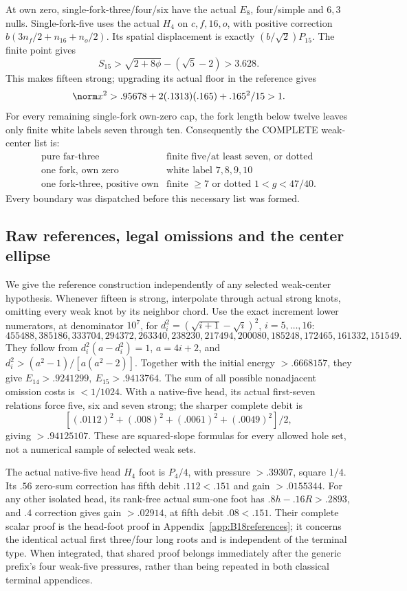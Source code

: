 At own zero, single-fork-three/four/six have the actual \(E_8\),
four/simple and \(6,3\) nulls. Single-fork-five uses the actual
\(H_4\) on \(c,f,16,o\), with positive correction
\(b(3n_f/2+n_{16}+n_o/2)\).
Its spatial displacement is exactly \((b/\sqrt2)P_{15}\).
The finite point gives
\[
 S_{15}>\sqrt{2+8\phi}-(\sqrt5-2)>3.628 .
\]
This makes fifteen strong; upgrading its actual floor in the reference
gives
\[
 \norm x^2>.95678+2(.1313)(.165)+.165^2/15>1 .
\]
For every remaining single-fork own-zero cap, the fork length below
twelve leaves only finite white labels seven through ten.
Consequently the COMPLETE weak-center list is:
\[
 \begin{array}{c|c}
 \text{pure far-three}&\text{finite five/at least seven, or dotted}\\
 \text{one fork, own zero}&\text{white label }7,8,9,10\\
 \text{one fork-three, positive own}&\text{finite }\geq7
                         \text{ or dotted }1<g<47/40 .
 \end{array}
\]
Every boundary was dispatched before this necessary list was formed.

\subsection{Raw references, legal omissions and the center ellipse}
\label{app:D18rawreferences}
We give the reference construction independently of any selected
weak-center hypothesis. Whenever fifteen is strong, interpolate through
actual strong knots, omitting every weak knot by its neighbor chord.
Use the exact increment lower numerators, at denominator \(10^7\),
for \(d_i^2=(\sqrt{i+1}-\sqrt i)^2\), \(i=5,\ldots,16\):
\[
455488,385186,333704,294372,263340,238230,
217494,200080,185248,172465,161332,151549 .
\]
They follow from \(d_i^2(a-d_i^2)=1\), \(a=4i+2\), and
\(d_i^2>(a^2-1)/[a(a^2-2)]\).
Together with the initial energy \(>.6668157\), they give
\(E_{14}>.9241299,\ E_{15}>.9413764\).
The sum of all possible nonadjacent omission costs is \(<1/1024\).
With a native-five head, its actual first-seven relations force
five, six and seven strong; the sharper complete debit is
\[
 [(.0112)^2+(.008)^2+(.0061)^2+(.0049)^2]/2 ,
\]
giving \(>.94125107\).
These are squared-slope formulas for every allowed hole set,
not a numerical sample of selected weak sets.

The actual native-five head \(H_4\) foot is \(P_4/4\), with
pressure \(>.39307\), square \(1/4\).
Its \(.56\) zero-sum correction has fifth debit \(.112<.151\)
and gain \(>.0155344\).
For any other isolated head, its rank-free actual sum-one foot
has \(.8h-.16R>.2893\), and \(.4\) correction gives
gain \(>.02914\), at fifth debit \(.08<.151\).
Their complete scalar proof is the head-foot proof in
Appendix~\ref{app:B18references}; it concerns the identical actual
first three/four long roots and is independent of the terminal type.
When integrated, that shared proof belongs immediately after the generic
prefix's four weak-five pressures, rather than being repeated in both
classical terminal appendices.


